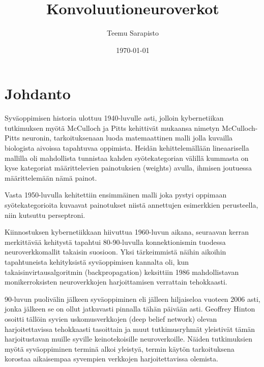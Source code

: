 \documentclass[finnish]{tktltiki2}
\title{Konvoluutioneuroverkot}
\author{Teemu Sarapisto}
\date{\today}
\theoremstyle{definition}
\theoremstyle{remark}
\begin{document}

  \frontmatter      %

  \maketitle        %
  \makeabstract     %

  \tableofcontents  %


  \mainmatter       %

  \section{Johdanto}
   Syväoppimisen historia ulottuu 1940-luvulle asti, jolloin kybernetiikan tutkimuksen myötä McCulloch ja Pitts kehittivät mukaansa nimetyn McCulloch-Pitts neuronin, tarkoituksenaan luoda matemaattinen malli jolla kuvailla biologista aivoissa tapahtuvaa oppimista. Heidän kehittelemällään lineaarisella mallilla oli mahdollista tunnistaa kahden syötekategorian välillä kummasta on kyse kategoriat määrittelevien painotuksien (weights) avulla, ihmisen joutuessa määrittelemään nämä painot.

  Vasta 1950-luvulla kehitettiin ensimmäinen malli joka pystyi oppimaan syötekategorioita kuvaavat painotukset niistä annettujen esimerkkien perusteella, niin kutsuttu perseptroni.

  Kiinnostuksen kybernetiikkaan hiivuttua 1960-luvun aikana, seuraavan kerran merkittävää kehitystä tapahtui 80-90-luvulla konnektionismin tuodessa neuroverkkomallit takaisin suosioon. Yksi tärkeimmistä näihin aikoihin tapahtuneista kehityksistä syväoppimisen kannalta oli, kun takaisinvirtausalgoritmin (backpropagation) keksittiin 1986 mahdollistavan monikerroksisten neuroverkkojen harjoittamisen verrattain tehokkaasti.

  90-luvun puolivälin jälkeen syväoppiminen eli jälleen hiljaiseloa vuoteen 2006 asti, jonka jälkeen se on ollut jatkuvasti pinnalla tähän päivään asti. Geoffrey Hinton osoitti tällöin syvien uskomusverkkojen (deep belief network) olevan harjoitettavissa tehokkaasti tasoittain ja muut tutkimusryhmät yleistivät tämän harjoitustavan muille syville keinotekoisille neuroverkoille. Näiden tutkimuksien myötä syväoppiminen terminä alkoi yleistyä, termin käytön tarkoituksena korostaa aikaisempaa syvempien verkkojen harjoitettavissa olemista.
\end{document}
